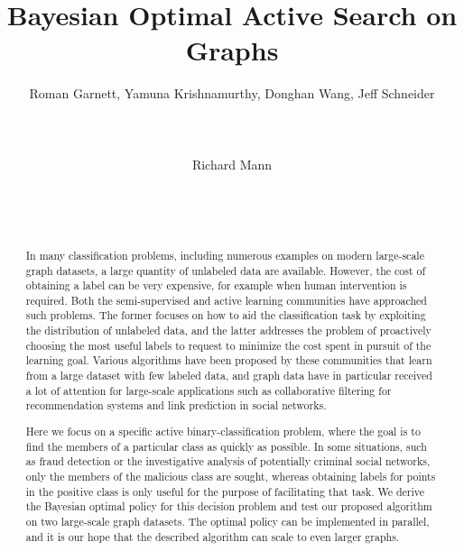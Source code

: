 \documentclass{acm_proc_article-sp}
\begin{document}
\title{Bayesian Optimal Active Search on Graphs}

\author{
  \alignauthor
  Roman Garnett, Yamuna Krishnamurthy, Donghan Wang, Jeff Schneider\\
  \\
  \\
  \\
  \alignauthor
  \vspace*{0.5\baselineskip}
  Richard Mann\\
  \\
  \\
  \\
}

\maketitle

\begin{abstract}
  In many classification problems, including numerous examples on
  modern large-scale graph datasets, a large quantity of unlabeled
  data are available. However, the cost of obtaining a label can be
  very expensive, for example when human intervention is required.
  Both the semi-supervised and active learning communities have
  approached such problems.  The former focuses on how to aid the
  classification task by exploiting the distribution of unlabeled
  data, and the latter addresses the problem of proactively choosing
  the most useful labels to request to minimize the cost spent in
  pursuit of the learning goal.  Various algorithms have been proposed
  by these communities that learn from a large dataset with few
  labeled data, and graph data have in particular received a lot of
  attention for large-scale applications such as collaborative
  filtering for recommendation systems and link prediction in social
  networks.

  Here we focus on a specific active binary-classification problem,
  where the goal is to find the members of a particular class as
  quickly as possible.  In some situations, such as fraud detection or
  the investigative analysis of potentially criminal social networks,
  only the members of the malicious class are sought, whereas
  obtaining labels for points in the positive class is only useful for
  the purpose of facilitating that task.  We derive the Bayesian
  optimal policy for this decision problem and test our proposed
  algorithm on two large-scale graph datasets.  The optimal policy can
  be implemented in parallel, and it is our hope that the described
  algorithm can scale to even larger graphs.
\end{abstract}
\end{document}
